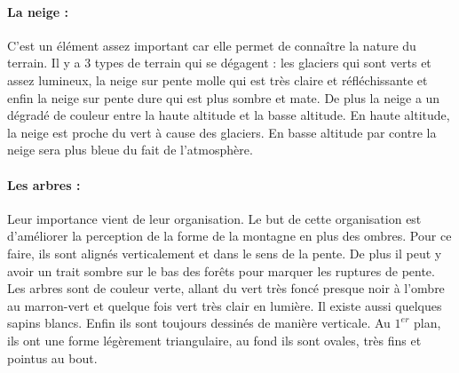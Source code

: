 \paragraph*{La neige :} C'est un élément assez important car elle permet de connaître la nature du terrain. Il y a 3 types de terrain qui se dégagent : les glaciers qui sont verts et assez lumineux, la neige sur pente molle qui est très claire et réfléchissante et enfin la neige sur pente dure qui est plus sombre et mate. De plus la neige a un dégradé de couleur entre la haute altitude et la basse altitude. En haute altitude, la neige est proche du vert à cause des glaciers. En basse altitude par contre la neige sera plus bleue du fait de l’atmosphère.  


\paragraph*{Les arbres :} Leur importance vient de leur organisation. Le but de cette organisation est d'améliorer la perception de la forme de la montagne en plus des ombres. Pour ce faire, ils sont alignés verticalement et dans le sens de la pente. De plus il peut y avoir un trait sombre sur le bas des forêts pour marquer les ruptures de pente. 
Les arbres sont de couleur verte, allant du vert très foncé presque noir à l'ombre au marron-vert et quelque fois vert très clair en lumière. Il existe aussi quelques sapins blancs. Enfin ils sont toujours dessinés de manière verticale. Au $1^{er}$ plan, ils ont une forme légèrement triangulaire, au fond ils sont ovales, très fins et pointus au bout.  




